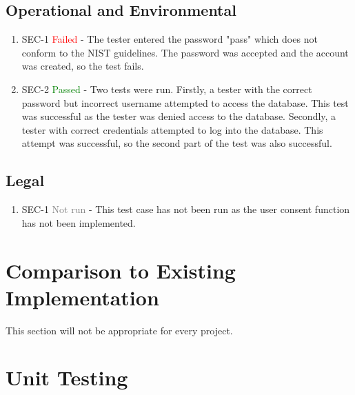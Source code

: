 \documentclass[12pt, titlepage]{article}
\begin{document}
\subsection{Operational and Environmental}
\begin{enumerate}
  \item SEC-1 \textcolor{red}{Failed} - The tester entered the password "pass" which does not conform to the NIST guidelines. The password was accepted and the account was created, so the test fails.
\item SEC-2 \textcolor{green}{Passed} - Two tests were run. Firstly, a tester with the correct password but incorrect username attempted to access the database. This test was successful as the tester was denied access to the database. Secondly, a tester with correct credentials attempted to log into the database. This attempt was successful, so the second part of the test was also successful.
\end{enumerate}

\subsection{Legal}
\begin{enumerate}
  \item SEC-1 \textcolor{gray}{Not run} - This test case has not been run as the user consent function has not been implemented.
\end{enumerate}

	
\section{Comparison to Existing Implementation}	

This section will not be appropriate for every project.

\section{Unit Testing}
\end{document}
